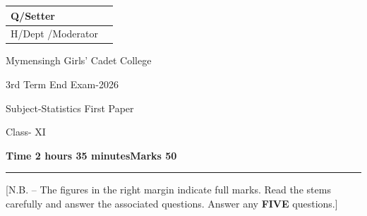 \documentclass[12pt]{article}
\begin{document}
\noindent
\begin{minipage}[t]{0.34\textwidth}
\vspace{0pt}
\renewcommand{\arraystretch}{1.3}
\begin{tabular}{|l|p{12mm}|}
\hline
Q/Setter & \\ \hline
H/Dept /Moderator & \\ \hline
\end{tabular}
\end{minipage}%
\begin{minipage}[t]{0.37\textwidth}
\vspace{0pt}
\raggedright
Mymensingh Girls' Cadet College\par
3rd Term End Exam-2026\par
Subject-Statistics First Paper\par
Class- XI\par
\end{minipage}%
\begin{minipage}[t]{0.29\textwidth}
\vspace{0pt}
\raggedleft
\setlength{\fboxsep}{4pt}
\renewcommand{\arraystretch}{1.2}
\par
\end{minipage}

\smallskip
\noindent\textbf{Time 2 hours 35 minutes}\hfill\textbf{Marks 50}\par\smallskip

\hrule
\begin{center}
[N.B. -- The figures in the right margin indicate full marks. Read the stems carefully and answer the associated questions. Answer any \textbf{FIVE} questions.]
\end{center}
\end{document}
